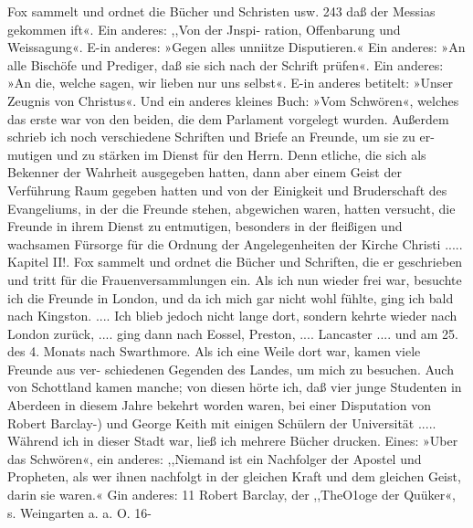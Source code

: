Fox sammelt und ordnet die Bücher und Schristen usw. 243
daß der Messias gekommen ift«. Ein anderes: ,,Von der Jnspi-
ration, Offenbarung und Weissagung«. E-in anderes: »Gegen
alles unniitze Disputieren.« Ein anderes: »An alle Bischöfe und
Prediger, daß sie sich nach der Schrift prüfen«. Ein anderes:
»An die, welche sagen, wir lieben nur uns selbst«. E-in anderes
betitelt: »Unser Zeugnis von Christus«. Und ein anderes kleines
Buch: »Vom Schwören«, welches das erste war von den beiden,
die dem Parlament vorgelegt wurden. Außerdem schrieb ich noch
verschiedene Schriften und Briefe an Freunde, um sie zu er-
mutigen und zu stärken im Dienst für den Herrn. Denn etliche,
die sich als Bekenner der Wahrheit ausgegeben hatten, dann
aber einem Geist der Verführung Raum gegeben hatten und von
der Einigkeit und Bruderschaft des Evangeliums, in der die
Freunde stehen, abgewichen waren, hatten versucht, die Freunde
in ihrem Dienst zu entmutigen, besonders in der fleißigen und
wachsamen Fürsorge für die Ordnung der Angelegenheiten der
Kirche Christi .....
Kapitel II!.
Fox sammelt und ordnet die Bücher und Schriften, die er
geschrieben und tritt für die Frauenversammlungen ein.
Als ich nun wieder frei war, besuchte ich die Freunde in
London, und da ich mich gar nicht wohl fühlte, ging ich bald
nach Kingston. .... Ich blieb jedoch nicht lange dort, sondern
kehrte wieder nach London zurück, .... ging dann nach Eossel,
Preston, .... Lancaster .... und am 25. des 4. Monats nach
Swarthmore.
Als ich eine Weile dort war, kamen viele Freunde aus ver-
schiedenen Gegenden des Landes, um mich zu besuchen. Auch
von Schottland kamen manche; von diesen hörte ich, daß vier
junge Studenten in Aberdeen in diesem Jahre bekehrt worden
waren, bei einer Disputation von Robert Barclay-) und George
Keith mit einigen Schülern der Universität ..... Während ich
in dieser Stadt war, ließ ich mehrere Bücher drucken. Eines:
»Uber das Schwören«, ein anderes: ,,Niemand ist ein Nachfolger
der Apostel und Propheten, als wer ihnen nachfolgt in der gleichen
Kraft und dem gleichen Geist, darin sie waren.« Gin anderes:
11 Robert Barclay, der ,,TheO1oge der Quüker«, s. Weingarten a. a. O.
16-


